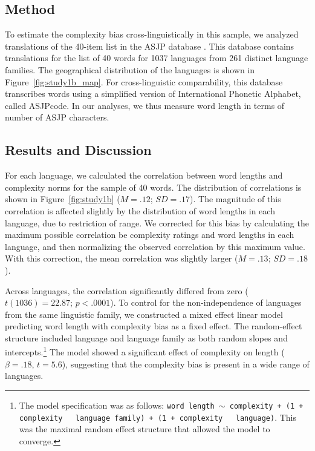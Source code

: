\subsection{Method}
To estimate the complexity bias cross-linguistically in this sample, we analyzed translations of the 40-item list in the  ASJP database \cite{asjp}. This database contains translations for the list of 40 words for 1037 languages from 261 distinct language families. The geographical distribution of the languages is shown in Figure\ \ref{fig:study1b_map}. For cross-linguistic comparability, this database transcribes words using a simplified version of International Phonetic Alphabet, called ASJPcode. In our analyses, we thus measure word length in terms of number of ASJP characters.

\subsection{Results and Discussion}
For each language, we calculated the correlation between word lengths and complexity norms for the sample of 40 words. The distribution of correlations is shown in  
Figure\ \ref{fig:study1b} ($M = .12$; $SD = .17$). The magnitude of this correlation is affected slightly by the distribution of word lengths in each language, due to restriction of range. We corrected for this bias by calculating the maximum possible correlation be complexity ratings and word lengths in each language, and then normalizing the observed correlation by this maximum value. With this correction, the mean correlation was slightly larger ($M = .13$; $SD = .18$). 

Across languages,  the correlation significantly differed from zero ($ t(1036)= 22.87$; $p <.0001$).  To control for the non-independence of languages from the same linguistic family, we constructed a mixed effect linear model predicting word length with complexity bias as a fixed effect. The random-effect structure included language and language family as both random slopes and intercepts.\footnote{The model specification was as follows: \texttt{word length $\sim$ complexity + (1 + complexity ~\textbar~language family) +  (1 + complexity ~\textbar~language)}. This was the maximal random effect structure that allowed the model to converge.}  The model showed a significant effect of complexity on length ($\beta = .18$, $t = 5.6$), suggesting that the complexity bias is present in a wide range of languages.

